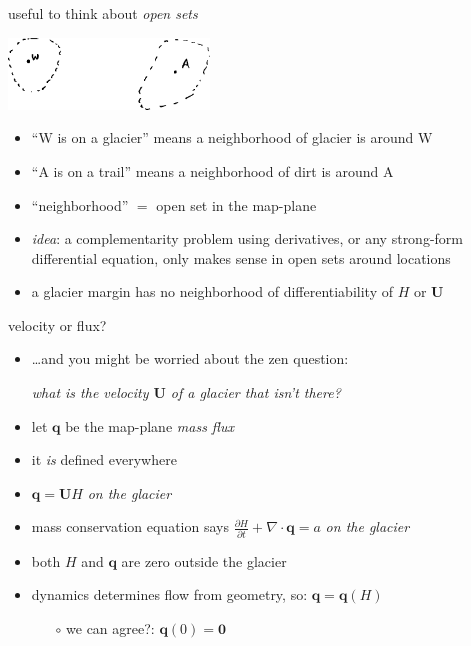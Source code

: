 \documentclass[10pt,hyperref,dvipsnames]{beamer}
\newcommand{\bq}{\mathbf{q}}
\newcommand{\bU}{\mathbf{U}}
\newcommand{\bzero}{\bm{0}}
\newcommand{\Div}{\nabla\cdot}
\begin{document}
\begin{frame}{useful to think about \emph{open sets}}

\begin{center}
\includegraphics[width=0.4\textwidth]{figs/opensets.png}
\end{center}

\begin{itemize}
\item ``W is on a glacier'' means a neighborhood of glacier is around W
\item ``A is on a trail'' means a neighborhood of dirt is around A
\item ``neighborhood'' $=$ open set in the map-plane

\medskip
\item \emph{idea}:  a complementarity problem using derivatives, or any strong-form differential equation, only makes sense in open sets around locations

\medskip
\item a glacier margin has no neighborhood of differentiability of $H$ or $\bU$
\end{itemize}
\end{frame}


\begin{frame}{velocity or flux?}
\begin{itemize}
\item \dots and you might be worried about the zen question:

\begin{center}
\emph{what is the velocity $\bU$ of a glacier that isn't there?}
\end{center}

\vspace{5mm}
\item<2> let $\bq$ be the map-plane \emph{mass flux}
\item<2> it \emph{is} defined everywhere
\item<2> $\bq = \bU H$ \emph{on the glacier}
\item<2> mass conservation equation says \quad $\frac{\partial H}{\partial t} + \Div \bq = a$ \quad \emph{on the glacier}
\item<2> both $H$ and $\bq$ are zero outside the glacier
\item<2> dynamics determines flow from geometry, so: \quad $\bq=\bq(H)$
    \begin{itemize}
    \item[$\circ$] we can agree?: \quad $\bq(0)=\bzero$
    \end{itemize}
\end{itemize}
\end{frame}
\end{document}
